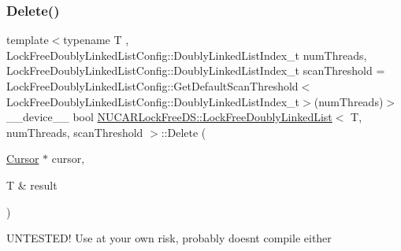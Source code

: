 \mbox{\label{class_n_u_c_a_r_lock_free_d_s_1_1_lock_free_doubly_linked_list_a139e22629c23ed917b0375ec0db842de}} 
\subsubsection{\texorpdfstring{Delete()}{Delete()}}
{\footnotesize\ttfamily template$<$typename T , Lock\+Free\+Doubly\+Linked\+List\+Config\+::\+Doubly\+Linked\+List\+Index\+\_\+t num\+Threads, Lock\+Free\+Doubly\+Linked\+List\+Config\+::\+Doubly\+Linked\+List\+Index\+\_\+t scan\+Threshold = Lock\+Free\+Doubly\+Linked\+List\+Config\+::\+Get\+Default\+Scan\+Threshold$<$\+Lock\+Free\+Doubly\+Linked\+List\+Config\+::\+Doubly\+Linked\+List\+Index\+\_\+t$>$(num\+Threads)$>$ \\
\+\_\+\+\_\+device\+\_\+\+\_\+ bool \mbox{\hyperlink{class_n_u_c_a_r_lock_free_d_s_1_1_lock_free_doubly_linked_list}{N\+U\+C\+A\+R\+Lock\+Free\+D\+S\+::\+Lock\+Free\+Doubly\+Linked\+List}}$<$ T, num\+Threads, scan\+Threshold $>$\+::Delete (\begin{DoxyParamCaption}\item[{\mbox{\hyperlink{class_n_u_c_a_r_lock_free_d_s_1_1_lock_free_doubly_linked_list_1_1_cursor}{Cursor}} $\ast$}]{cursor,  }\item[{T \&}]{result }\end{DoxyParamCaption})\hspace{0.3cm}{\ttfamily [inline]}}

U\+N\+T\+E\+S\+T\+E\+D! Use at your own risk, probably doesn\textquotesingle{}t compile either \mbox{\label{class_n_u_c_a_r_lock_free_d_s_1_1_lock_free_doubly_linked_list_a35981d7dca5fc10c5228c67c1d8a64d7}} 
